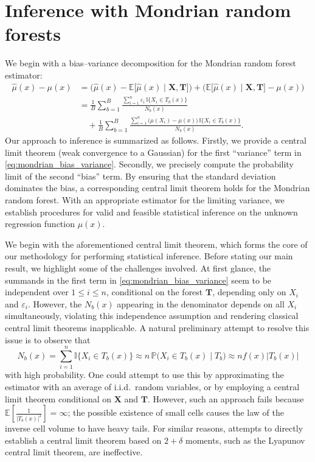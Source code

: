 \documentclass[11pt,lof]{puthesis}
\renewcommand{\P}{\ensuremath{\mathbb{P}}}
\newcommand{\E}{\ensuremath{\mathbb{E}}}
\newcommand{\I}{\ensuremath{\mathbb{I}}}
\newcommand{\bX}{\ensuremath{\mathbf{X}}}
\newcommand{\bT}{\ensuremath{\mathbf{T}}}
\theoremstyle{break}
\theoremstyle{proof}
\begin{document}
\section{Inference with Mondrian random forests}%
\label{sec:mondrian_inference}

We begin with a bias--variance decomposition for the Mondrian random
forest estimator:
%
\begin{align}
  \nonumber
  \hat\mu(x) - \mu(x)
  &=
  \Big( \hat\mu(x) - \E \big[ \hat \mu(x) \mid \bX, \bT \big]\Big)
  + \Big( \E \big[ \hat \mu(x) \mid \bX, \bT \big] - \mu(x)\Big) \\
  &=
  \nonumber
  \frac{1}{B} \sum_{b=1}^B
  \frac{\sum_{i=1}^n \varepsilon_i \, \I\big\{ X_i \in T_b(x) \big\}}
  {N_b(x)} \\
  \label{eq:mondrian_bias_variance}
  &\quad+
  \frac{1}{B} \sum_{b=1}^B
  \frac{\sum_{i=1}^n \big(\mu(X_i) - \mu(x)\big) \,
  \I\big\{ X_i \in T_b(x) \big\}} {N_b(x)}.
\end{align}
%
Our approach to inference is summarized as follows. Firstly, we provide a
central limit theorem (weak convergence to a Gaussian) for the first
``variance'' term in \eqref{eq:mondrian_bias_variance}. Secondly, we precisely
compute
the probability limit of the second ``bias'' term. By ensuring that the
standard deviation dominates the bias, a corresponding
central limit theorem holds for the Mondrian random forest. With an appropriate
estimator for the limiting variance, we establish procedures for valid and
feasible statistical inference on the unknown regression function $\mu(x)$.

We begin with the aforementioned central limit theorem, which forms the core of
our methodology for performing statistical inference. Before stating our main
result, we highlight some of the challenges involved. At first glance, the
summands in the first term in \eqref{eq:mondrian_bias_variance} seem to be
independent
over $1 \leq i \leq n$, conditional on the forest $\bT$, depending only on
$X_i$ and $\varepsilon_i$. However, the $N_b(x)$ appearing in the denominator
depends on all $X_i$ simultaneously, violating this independence assumption and
rendering classical central limit theorems inapplicable. A natural preliminary
attempt to resolve this issue is to observe that
%
\begin{equation*}
  N_b(x)= \sum_{i=1}^{n} \I\big\{X_i \in T_b(x)\big\}
  \approx n \, \P \big( X_i \in T_b(x) \mid T_b \big)
  \approx n f(x) |T_b(x)|
\end{equation*}
%
with high probability. One could attempt to use this by approximating the
estimator with an average of i.i.d.\ random variables, or by employing a
central limit theorem conditional on $\bX$ and $\bT$. However, such an approach
fails because $\E \left[ \frac{1}{|T_b(x)|^2} \right] = \infty$; the possible
existence of small cells causes the law of the inverse cell volume to have
heavy tails. For similar reasons, attempts to directly establish a central
limit theorem based on $2 + \delta$ moments, such as the Lyapunov central limit
theorem, are ineffective.
\end{document}

